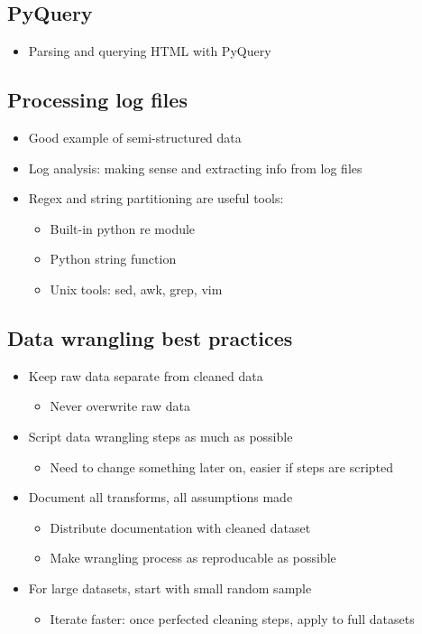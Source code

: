 \documentclass[a4paper]{article}
\begin{document}
\subsection{PyQuery}
\begin{itemize}
	\item Parsing and querying HTML with PyQuery
\end{itemize}
\subsection{Processing log files}
\begin{itemize}
	\item Good example of semi-structured data
	\item Log analysis: making sense and extracting info from log files
	\item Regex and string partitioning are useful tools:
	\begin{itemize}
		\item Built-in python re module
		\item Python string function
		\item Unix tools: sed, awk, grep, vim
	\end{itemize}
\end{itemize}
\subsection{Data wrangling best practices}
\begin{itemize}
	\item Keep raw data separate from cleaned data
	\begin{itemize}
		\item Never overwrite raw data
	\end{itemize}
	\item Script data wrangling steps as much as possible
	\begin{itemize}
		\item Need to change something later on, easier if steps are
			scripted
	\end{itemize}
	\item Document all transforms, all assumptions made
	\begin{itemize}
		\item Distribute documentation with cleaned dataset
		\item Make wrangling process as reproducable as possible
	\end{itemize}
	\item For large datasets, start with small random sample
	\begin{itemize}
		\item Iterate faster: once perfected cleaning steps, apply to
			full datasets
	\end{itemize}
\end{itemize}
\end{document}
